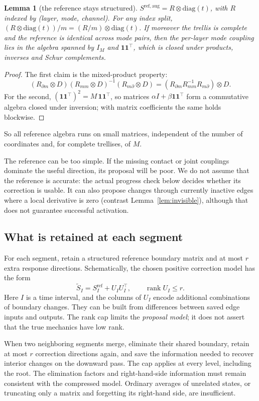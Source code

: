 \documentclass[11pt]{article}
\theoremstyle{plain}
\newtheorem{lemma}[theorem]{Lemma}
\theoremstyle{definition}
\theoremstyle{remark}
\begin{document}
\begin{lemma}[the reference stays structured]\label{lem:kron}
$S^{\mathrm{ref,aug}}=R\otimes\mathrm{diag}(t)$, with $R$ indexed by (layer, mode, channel). For any index split, $(R\otimes\mathrm{diag}(t))/m=(R/m)\otimes\mathrm{diag}(t)$. If moreover the trellis is complete and the reference is identical across mode pairs, then the per-layer mode coupling lies in the algebra spanned by $I_M$ and $\mathbf 1\mathbf 1^\top$, which is closed under products, inverses and Schur complements.
\end{lemma}
\begin{proof}
The first claim is the mixed-product property:
\[
(R_{\partial m}\otimes D)(R_{mm}\otimes D)^{-1}(R_{m\partial}\otimes D)=(R_{\partial m}R_{mm}^{-1}R_{m\partial})\otimes D .
\] For the second, $(\mathbf 1\mathbf 1^\top)^2=M\,\mathbf 1\mathbf 1^\top$, so matrices $\alpha I+\beta\mathbf 1\mathbf 1^\top$ form a commutative algebra closed under inversion; with matrix coefficients the same holds blockwise.
\end{proof}
So all reference algebra runs on small matrices, independent of the number of coordinates and, for complete trellises, of $M$.

The reference can be too simple. If the missing contact or joint couplings dominate the useful direction, its proposal will be poor. We do not assume that the reference is accurate: the actual progress check below decides whether its correction is usable. It can also propose changes through currently inactive edges where a local derivative is zero (contrast Lemma~\ref{lem:invisible}), although that does not guarantee successful activation.

\subsection{What is retained at each segment}
For each segment, retain a structured reference boundary matrix and at most $r$ extra response directions. Schematically, the chosen positive correction model has the form
\[
\tilde S_I=S^{\mathrm{ref}}_I+U_IU_I^\top,\qquad\operatorname{rank}U_I\le r .
\]
Here $I$ is a time interval, and the columns of $U_I$ encode additional combinations of boundary changes. They can be built from differences between saved edge inputs and outputs. The rank cap limits the \emph{proposal model}; it does not assert that the true mechanics have low rank.

When two neighboring segments merge, eliminate their shared boundary, retain at most $r$ correction directions again, and save the information needed to recover interior changes on the downward pass. The cap applies at every level, including the root. The elimination factors and right-hand-side information must remain consistent with the compressed model. Ordinary averages of unrelated states, or truncating only a matrix and forgetting its right-hand side, are insufficient.
\end{document}
